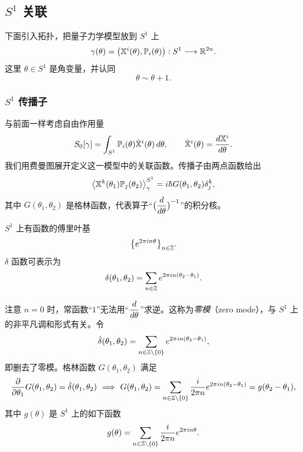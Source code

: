 \subsection{$S^1$ 关联}

下面引入拓扑，把量子力学模型放到 $S^1$ 上
\[
\gamma(\theta)=\bigl(\mathbb X^i(\theta),\mathbb P_i(\theta)\bigr):
S^1\longrightarrow\mathbb{R}^{2n}.
\]
这里 $\theta\in S^1$ 是角变量，并认同
\[
\theta\sim\theta+1.
\]
\begin{center}
\end{center}

\subsubsection*{$S^1$ 传播子}

与前面一样考虑自由作用量
\[
S_0[\gamma]=\int_{S^1}\mathbb P_i(\theta)\dot{\mathbb X}^i(\theta)\,d\theta,
\qquad
\dot{\mathbb X}^i(\theta)=\frac{d\mathbb X^i}{d\theta}.
\]
我们用费曼图展开定义这一模型中的关联函数。传播子由两点函数给出
\[
\bigl\langle\mathbb X^k(\theta_1)\mathbb P_j(\theta_2)\bigr\rangle_\gamma^{S^1}
=i\hbar G(\theta_1,\theta_2)\delta^k_j,
\]
其中 $G(\theta_1,\theta_2)$ 是格林函数，代表算子“$\bigl(\dfrac{d}{d\theta}\bigr)^{-1}$”的积分核。

$S^1$ 上有函数的傅里叶基
\[
\bigl\{e^{2\pi i n\theta}\bigr\}_{n\in\mathbb{Z}}.
\]
$\delta$ 函数可表示为
\[
\delta(\theta_1,\theta_2)=\sum_{n\in\mathbb{Z}}e^{2\pi i n(\theta_2-\theta_1)}.
\]

注意 $n=0$ 时，常函数“$1$”无法用“$\dfrac{d}{d\theta}$”求逆。这称为\emph{零模}（zero mode），与 $S^1$ 上的非平凡调和形式有关。令
\[
\hat\delta(\theta_1,\theta_2)=\sum_{n\in\mathbb{Z}\setminus\{0\}}e^{2\pi i n(\theta_2-\theta_1)},
\]
即删去了零模。格林函数 $G(\theta_1,\theta_2)$ 满足
\[
\frac{\partial}{\partial\theta_1}G(\theta_1,\theta_2)=\hat\delta(\theta_1,\theta_2)
\ \Longrightarrow\
G(\theta_1,\theta_2)=\sum_{n\in\mathbb{Z}\setminus\{0\}}\frac{i}{2\pi n}
e^{2\pi i n(\theta_2-\theta_1)}=g(\theta_2-\theta_1),
\]
其中 $g(\theta)$ 是 $S^1$ 上的如下函数
\[
g(\theta)=\sum_{n\in\mathbb{Z}\setminus\{0\}}\frac{i}{2\pi n}e^{2\pi i n\theta}.
\]


